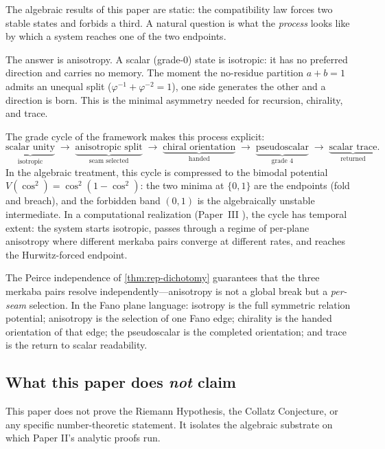 \documentclass[11pt,a4paper]{article}
\theoremstyle{plain}
\theoremstyle{definition}
\theoremstyle{remark}
\numberwithin{equation}{section}
\providecommand{\vp}{\varphi}
\begin{document}
The algebraic results of this paper are static: the compatibility
law forces two stable states and forbids a third.  A natural
question is what the \emph{process} looks like by which a system
reaches one of the two endpoints.

The answer is anisotropy.  A scalar (grade-$0$) state is
isotropic: it has no preferred direction and carries no memory.
The moment the no-residue partition $a + b = 1$ admits an
unequal split ($\vp^{-1} + \vp^{-2} = 1$), one side generates
the other and a direction is born.  This is the minimal asymmetry
needed for recursion, chirality, and trace.

The grade cycle of the framework makes this process explicit:
\[
  \underbrace{\text{scalar unity}}_{\text{isotropic}}
  \;\to\;
  \underbrace{\text{anisotropic split}}_{\text{seam selected}}
  \;\to\;
  \underbrace{\text{chiral orientation}}_{\text{handed}}
  \;\to\;
  \underbrace{\text{pseudoscalar}}_{\text{grade 4}}
  \;\to\;
  \underbrace{\text{scalar trace}}_{\text{returned}}.
\]
In the algebraic treatment, this cycle is compressed to the
bimodal potential $V(\cos^2) = \cos^2(1 - \cos^2)$: the two
minima at $\{0, 1\}$ are the endpoints (fold and breach), and the
forbidden band $(0, 1)$ is the algebraically unstable intermediate.
In a computational realization (Paper~III \cite[\S 12]{paper-III-monad}),
the cycle has temporal extent: the system starts isotropic, passes
through a regime of per-plane anisotropy where different merkaba
pairs converge at different rates, and reaches the
Hurwitz-forced endpoint.

The Peirce independence of
\cref{thm:rep-dichotomy} guarantees that the three
merkaba pairs resolve independently---anisotropy is not a global
break but a \emph{per-seam} selection.  In the Fano plane
language: isotropy is the full symmetric relation potential;
anisotropy is the selection of one Fano edge; chirality is the
handed orientation of that edge; the pseudoscalar is the completed
orientation; and trace is the return to scalar readability.

\subsection*{What this paper does \emph{not} claim}

This paper does not prove the Riemann Hypothesis, the Collatz
Conjecture, or any specific number-theoretic statement.  It
isolates the algebraic substrate on which Paper II's analytic
proofs run.
\end{document}
